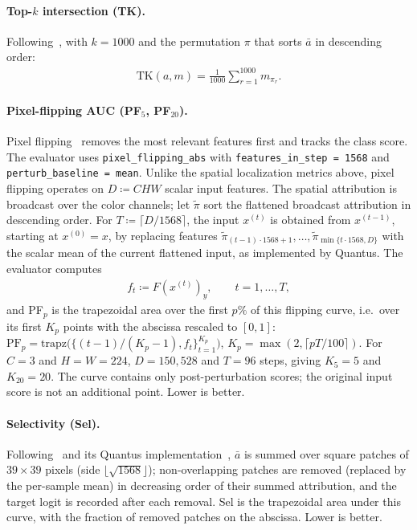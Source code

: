 \documentclass[twoside]{article}
\newcommand{\1}{\mathbf{1}}
\begin{document}
\paragraph{Top-$k$ intersection (TK).} Following~\citet{Theiner2022geolocation}, with $k = 1000$ and the permutation $\pi$ that sorts
$\bar{a}$ in descending order:
\begin{align}
    \text{TK}(a, m) = \frac{1}{1000} \sum_{r=1}^{1000} m_{\pi_r}.
\end{align}

\paragraph{Pixel-flipping AUC (PF$_5$, PF$_{20}$).} Pixel flipping~\citep{Bach2015, Samek2017evaluating} removes the most relevant features first
and tracks the class score. The evaluator uses \texttt{pixel\_flipping\_abs} with
\texttt{features\_in\_step = 1568} and \texttt{perturb\_baseline = mean}. Unlike the spatial
localization metrics above, pixel flipping operates on $D \coloneqq CHW$ scalar input features.
The spatial attribution is broadcast over the color channels; let $\widetilde\pi$ sort the
flattened broadcast attribution in descending order. For $T \coloneqq \lceil D/1568 \rceil$, the
input $x^{(t)}$ is obtained from $x^{(t-1)}$, starting at $x^{(0)}=x$, by replacing features
$\widetilde\pi_{(t-1)\cdot1568+1},\dots,\widetilde\pi_{\min\{t\cdot1568,D\}}$ with the scalar mean
of the current flattened input, as implemented by Quantus.
The evaluator computes
\begin{align}
    f_t \coloneqq F(x^{(t)})_y, \qquad t = 1, \dots, T,
\end{align}
and PF$_p$ is the trapezoidal area over the first $p\%$ of this flipping curve, i.e.\ over its
first $K_p$ points with the abscissa rescaled to $[0,1]$: $\text{PF}_p =
    \text{trapz}\bigl(\{(t-1)/(K_p-1), f_t\}_{t=1}^{K_p}\bigr)$, $K_p = \max(2, \lceil pT/100 \rceil)$.
For $C=3$ and $H=W=224$, $D=150{,}528$ and $T=96$ steps, giving $K_5=5$ and $K_{20}=20$.
The curve contains only post-perturbation scores; the original input score is not an additional
point. Lower is better.

\paragraph{Selectivity (Sel).} Following~\citet{Montavon2018methods} and its Quantus implementation~\citep{hedstrom2023quantus},
$\bar{a}$ is summed over square patches of $39{\times}39$ pixels (side
$\lfloor\sqrt{1568}\rfloor$); non-overlapping patches are removed (replaced by the per-sample mean)
in decreasing order of their summed attribution, and the target logit is recorded after each
removal. Sel is the trapezoidal area under this curve, with the fraction of removed patches on the
abscissa. Lower is better.
\end{document}
